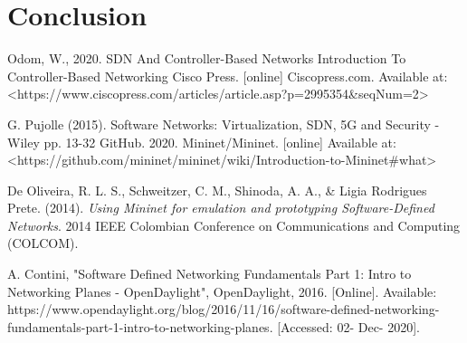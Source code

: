\documentclass[conference]{IEEEtran}
\begin{document}
\section{\textbf{Conclusion}}



\begin{thebibliography}{00}
 Odom, W., 2020. SDN And Controller-Based Networks Introduction To Controller-Based Networking  Cisco Press. [online] Ciscopress.com. Available at: <https://www.ciscopress.com/articles/article.asp?p=2995354\&seqNum=2>

G. Pujolle (2015). Software Networks: Virtualization, SDN, 5G and Security - Wiley  pp. 13-32 
GitHub. 2020. Mininet/Mininet. [online] Available at: <https://github.com/mininet/mininet/wiki/Introduction-to-Mininet\#what>

De Oliveira, R. L. S., Schweitzer, C. M., Shinoda, A. A., \& Ligia Rodrigues Prete. (2014). 
\textit{Using Mininet for emulation and prototyping Software-Defined Networks}. 
2014 IEEE Colombian Conference on Communications and Computing (COLCOM). 

A. Contini, "Software Defined Networking Fundamentals Part 1: Intro to Networking Planes - OpenDaylight", OpenDaylight, 2016. [Online]. Available: https://www.opendaylight.org/blog/2016/11/16/software-defined-networking-fundamentals-part-1-intro-to-networking-planes. [Accessed: 02- Dec- 2020].

\end{thebibliography}
\end{document}
